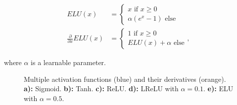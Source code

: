 \begin {align}
	ELU(x) &= \begin{cases}
			x \text { if } x \geq 0\\
			\alpha(e^x - 1) \text{ else}
		     \end{cases}\\
	\frac{\partial}{\partial x} ELU(x) &= \begin{cases}
								1 \text { if } x \geq 0\\
								ELU(x) + \alpha \text{ else}
		    				     \end{cases},
\end {align}

\noindent where $\alpha$ is a learnable parameter.


\begin {figure}[!ht]
	\begin{center}
	\begin {subfigure}[{position=b}]{0.3\linewidth}
		\scalebox{0.60}{}
		\caption{}
	\end {subfigure}
		\begin {subfigure}[{position=b}]{0.3\linewidth}
		\scalebox{0.60}{}
		\caption{}
	\end {subfigure}
	\end{center}

	\begin {center}
	\begin {subfigure}[{position=b}]{0.3\linewidth}
		\scalebox{0.60}{}
		\caption{}
	\end {subfigure}
	\begin {subfigure}[{position=b}]{0.3\linewidth}
		\scalebox{0.60}{}
		\caption{}
	\end {subfigure}
	\begin {subfigure}[{position=b}]{0.3\linewidth}
		\scalebox{0.60}{}
		\caption{}
	\end {subfigure}
	\end{center}

		\caption[]{Multiple activation functions (blue) and their derivatives (orange). \textbf{a):} Sigmoid. \textbf{b):} Tanh. \textbf{c):} ReLU. \textbf{d):} LReLU with $\alpha = 0.1$. \textbf{e):} ELU with $\alpha = 0.5$.}
		\label{fig:activation_functions}

\end {figure}




